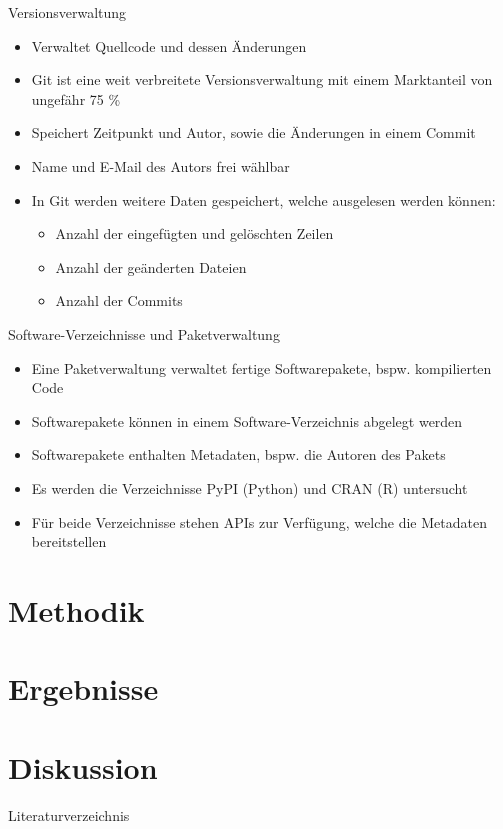 \documentclass[%
    handout,
    aspectratio=1610,
    10pt,
    onlytextwidth, %
]{beamer}
\begin{document}
\begin{frame}{\secname}{Versionsverwaltung}
    \begin{itemize}
        \item Verwaltet Quellcode und dessen Änderungen
        \item Git ist eine weit verbreitete Versionsverwaltung mit einem Marktanteil von ungefähr 75 \% \autocite{lindner_version_2024}
        \item Speichert Zeitpunkt und Autor, sowie die Änderungen in einem Commit
        \item Name und E-Mail des Autors frei wählbar
        \item In Git werden weitere Daten gespeichert, welche ausgelesen werden können:
        \begin{itemize}
            \item Anzahl der eingefügten und gelöschten Zeilen
            \item Anzahl der geänderten Dateien
            \item Anzahl der Commits
        \end{itemize}
    \end{itemize}
\end{frame}

\begin{frame}{\secname}{Software-Verzeichnisse und Paketverwaltung}
    \begin{itemize}
        \item Eine Paketverwaltung verwaltet fertige Softwarepakete, bspw. kompilierten Code
        \item Softwarepakete können in einem Software-Verzeichnis abgelegt werden
        \item Softwarepakete enthalten Metadaten, bspw. die Autoren des Pakets
        \item Es werden die Verzeichnisse PyPI (Python) und CRAN (R) untersucht
        \item Für beide Verzeichnisse stehen APIs zur Verfügung, welche die Metadaten bereitstellen
    \end{itemize}
\end{frame}

\section{Methodik}

\section{Ergebnisse}
\section{Diskussion}

\begin{frame}{Literaturverzeichnis}
    \printbibliography
\end{frame}

\end{document}
